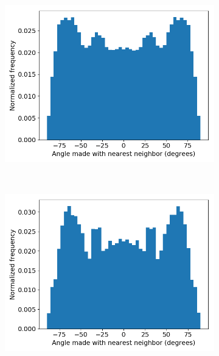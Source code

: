 \documentclass{article}
\begin{document}
\begin{figure}[ht]
\centering
\begin{subfigure}{0.3\linewidth}
	\centering
	\includegraphics[width=\linewidth]{offset_tail_packing.png}
	\caption{}~\label{fig:offset_tails}	
\end{subfigure}
\begin{subfigure}{0.3\linewidth}
	\centering
	\includegraphics[width=\linewidth]{angles_traj_layered.png}
	\caption{}~\label{fig:layered_tails}
\end{subfigure}
\begin{subfigure}{0.3\linewidth}
	\centering

\end{subfigure}
\end{figure}
\end{document}
